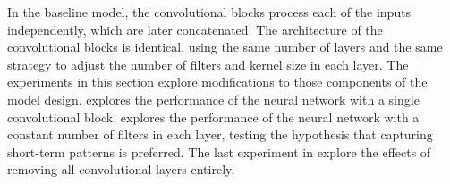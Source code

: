
In the baseline model, the convolutional blocks process each
of the inputs independently, which are later concatenated.
The architecture of the convolutional blocks is identical,
using the same number of layers and the same strategy to
adjust the number of filters and kernel size in each layer.
The experiments in this section explore modifications to
those components of the model design.
 explores the
performance of the neural network with a single
convolutional block. 
explores the performance of the neural network with a
constant number of filters in each layer, testing the
hypothesis that capturing short-term patterns is preferred.
The last experiment in 
explore the effects of removing all convolutional layers
entirely.
